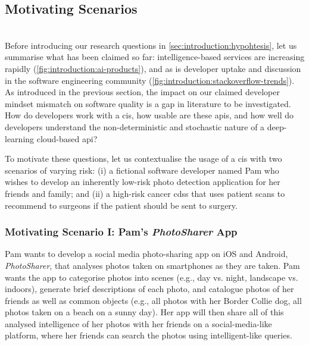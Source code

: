 \subsection{Motivating Scenarios}
\label{ssec:introduction:motivation:scenario}

\\
Before introducing our research questions in \cref{sec:introduction:hypohtesis}, let us summarise what has been claimed so far: intelligence-based services are increasing rapidly (\cref{fig:introduction:ai-products}), and as is developer uptake and discussion in the software engineering community (\cref{fig:introduction:stackoverflow-trends}). As introduced in the previous section, the impact on our claimed developer mindset mismatch on software quality is a gap in literature to be investigated. How do developers work with a \gls{cis}, how usable are these \glspl{api}, and how well do developers understand the non-deterministic and stochastic nature of a deep-learning cloud-based \gls{api}? 

To motivate these questions, let us contextualise the usage of a \gls{cis} with two scenarios of varying risk: (i) a fictional software developer named Pam who wishes to develop an inherently low-risk photo detection application for her friends and family; and (ii) a high-risk cancer \gls{cdss} that uses patient scans to recommend to surgeons if the patient should be sent to surgery.
  
\subsubsection{Motivating Scenario I: Pam's \textit{PhotoSharer} App}
\label{ssec:introduction:motivation:scenario:pam}

Pam wants to develop a social media photo-sharing app on iOS and Android, \textit{PhotoSharer}, that analyses photos taken on smartphones as they are taken. Pam wants the app to categorise photos into scenes (e.g., day vs. night, landscape vs. indoors), generate brief descriptions of each photo, and catalogue photos of her friends as well as common objects (e.g., all photos with her Border Collie dog, all photos taken on a beach on a sunny day). Her app will then share all of this analysed intelligence of her photos with her friends on a social-media-like platform, where her friends can search the photos using intelligent-like queries.

